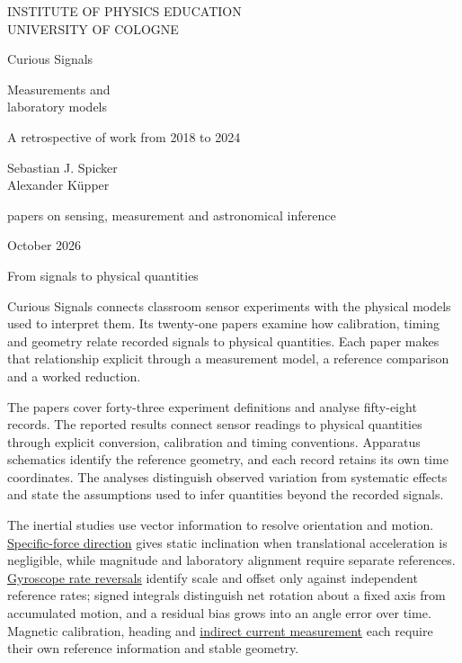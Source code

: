 \documentclass[11pt,letterpaper]{article}
\newcommand{\paperlink}[2]{\href{cs-paper:#1}{#2}}
\newcommand{\overviewheading}[1]{%
  \par\vspace{0.65em}{\large\bfseries #1\par}\vspace{0.12em}}
\newcommand{\fronttitle}[1]{%
  {\fontsize{28}{33}\selectfont #1\par}\vspace{0.55em}}
\begin{document}
\thispagestyle{empty}
{\small\sffamily INSTITUTE OF PHYSICS EDUCATION\\UNIVERSITY OF COLOGNE}

\vspace*{1.0in}
{\fontsize{44}{49}\selectfont Curious Signals\par}
\vspace{0.23in}
{\fontsize{25}{31}\selectfont Measurements and\\laboratory models\par}

\vspace{0.5in}
{\large A retrospective of work from 2018 to 2024\par}

\vspace{0.48in}
{\large Sebastian J. Spicker\\[0.15em]Alexander K\"upper\par}

\vfill
{\normalsize
papers on sensing, measurement and astronomical inference\par}
\vspace{0.22in}
{\small October 2026}

\newpage
{}
\fronttitle{From signals to physical quantities}

Curious Signals connects classroom sensor experiments with the physical models
used to interpret them. Its twenty-one papers examine how calibration, timing and
geometry relate recorded signals to physical quantities. Each paper makes that
relationship explicit through a measurement model, a reference comparison and a
worked reduction.

The papers cover forty-three experiment definitions and analyse fifty-eight
records. The reported results connect sensor readings to physical quantities
through explicit conversion, calibration and timing conventions. Apparatus
schematics identify the reference geometry, and each record retains its own time
coordinates. The analyses distinguish observed variation from systematic effects
and state the assumptions used to infer quantities beyond the recorded signals.

\overviewheading{Motion, fields and electrical measurements}
The inertial studies use vector information to resolve orientation and motion.
\paperlink{accelerometer}{Specific-force direction} gives static inclination
when translational acceleration is negligible, while magnitude and laboratory
alignment require separate references. \paperlink{gyroscope}{Gyroscope rate
reversals} identify scale and offset only against independent reference rates;
signed integrals distinguish net rotation about a fixed axis from accumulated
motion, and a residual bias grows into an angle error over time. Magnetic
calibration, heading and \paperlink{magnetometer}{indirect current measurement}
each require their own reference information and stable geometry.
\end{document}
